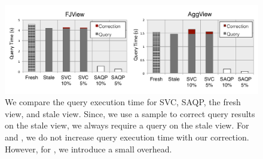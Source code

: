 \begin{figure}[h]
\centering
 \includegraphics[width=\columnwidth]{exp/total_time_agg_view.pdf}\vspace{-1em}
 \caption{We compare the query execution time for SVC, SAQP, the fresh view, and stale view. Since, we use a sample to correct query results on the stale view, we always require a query on the stale view. For \fjview and \spview, we do not increase query execution time with our correction. However, for \aggview, we introduce a small overhead.\label{exp10overheads}}\vspace{-1em}
\end{figure}

